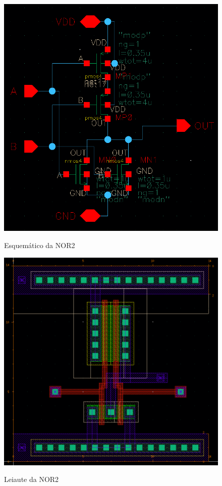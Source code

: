 \documentclass{iiufrgs}
\begin{document}
\begin{figure}[htbp]
    \centering
    \caption{Esquemático da NOR2}
    \includegraphics[scale=0.8]{images/schem_nor.png}
    \label{fig:esquematico-nor}
\end{figure}

\begin{figure}[htbp]
    \centering
    \caption{Leiaute da NOR2}
    \includegraphics[scale=0.7]{images/layout_nor.png}
    \label{fig:leiaute-nor}
\end{figure}
\end{document}
